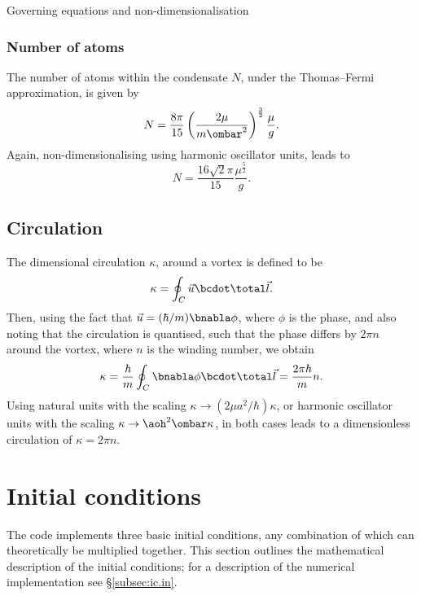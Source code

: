 \begin{chapter}{\label{cha:equations}Governing equations and
  non-dimensionalisation}
  \subsubsection{Number of atoms}
  The number of atoms within the condensate $N$, under the Thomas--Fermi
  approximation, is given by
  \begin{equation*}
    N = \frac{8\pi}{15} \left( \frac{2\mu}{m\ombar^2} \right)^{\frac{3}{2}}
    \frac{\mu}{g}.
  \end{equation*}
  Again, non-dimensionalising using harmonic oscillator units, leads to
  \begin{equation*}
    N = \frac{16\sqrt{2}\pi}{15} \frac{\mu^{\frac{5}{2}}}{g}.
  \end{equation*}

  \subsection{Circulation}
  The dimensional circulation $\kappa$, around a vortex is defined to be
  \begin{equation*}
    \kappa = \oint_{C}{\vec{u}\bcdot\total\vec{l}}.
  \end{equation*}
  Then, using the fact that $\vec{u} = (\hbar/m)\bnabla\phi$, where $\phi$ is
  the phase, and also noting that the circulation is quantised, such that the
  phase differs by $2\pi n$ around the vortex, where $n$ is the winding number,
  we obtain
  \begin{equation*}
    \kappa = \frac{\hbar}{m} \oint_{C}{\bnabla\phi\bcdot\total\vec{l}} =
    \frac{2\pi\hbar}{m}n.
  \end{equation*}
  Using natural units with the scaling $\kappa \to (2\mu a^{2}/\hbar)\kappa$,
  or harmonic oscillator units with the scaling $\kappa \to
  \aoh^{2}\ombar\kappa$, in both cases leads to a dimensionless circulation of
  $\kappa = 2\pi n$.

  \section{Initial conditions}
  The code implements three basic initial conditions, any combination of which
  can theoretically be multiplied together.  This section outlines the
  mathematical description of the initial conditions; for a description of the
  numerical implementation see \S\ref{subsec:ic.in}.


\end{chapter}
